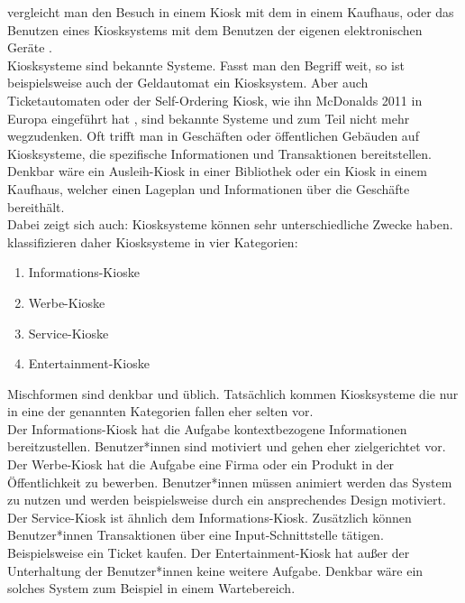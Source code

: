 vergleicht man den Besuch in einem Kiosk mit dem in einem Kaufhaus, oder das Benutzen eines Kiosksystems
mit dem Benutzen der eigenen elektronischen Geräte \cite{multimediale}.\\
Kiosksysteme sind bekannte Systeme. Fasst man den Begriff weit, so ist beispielsweise auch der Geldautomat ein Kiosksystem.
Aber auch Ticketautomaten oder der Self-Ordering Kiosk, wie ihn McDonalds 2011 in Europa 
eingeführt hat \cite{mcdonalds}, sind bekannte Systeme und zum Teil nicht mehr wegzudenken. Oft trifft man in 
Geschäften oder öffentlichen Gebäuden auf Kiosksysteme, die spezifische Informationen und Transaktionen 
bereitstellen. Denkbar wäre ein Ausleih-Kiosk in einer Bibliothek oder ein Kiosk in einem Kaufhaus, welcher einen
Lageplan und Informationen über die Geschäfte bereithält.\\
Dabei zeigt sich auch: Kiosksysteme können sehr unterschiedliche Zwecke haben.  klassifizieren daher
Kiosksysteme in vier Kategorien:

\begin{enumerate}
\item Informations-Kioske
\item Werbe-Kioske
\item Service-Kioske
\item Entertainment-Kioske
\end{enumerate}

Mischformen sind denkbar und üblich. Tatsächlich kommen Kiosksysteme die nur in eine der genannten Kategorien fallen
eher selten vor.\\
Der Informations-Kiosk hat die Aufgabe kontextbezogene Informationen bereitzustellen. Benutzer*innen sind motiviert und
gehen eher zielgerichtet vor. 
Der Werbe-Kiosk hat die Aufgabe eine Firma oder ein Produkt in der Öffentlichkeit zu
bewerben. Benutzer*innen müssen animiert werden das System zu nutzen und werden beispielsweise durch ein ansprechendes
Design motiviert.
Der Service-Kiosk ist ähnlich dem Informations-Kiosk. Zusätzlich können Benutzer*innen Transaktionen über eine 
Input-Schnittstelle tätigen. Beispielsweise ein Ticket kaufen.
Der Entertainment-Kiosk hat außer der Unterhaltung der Benutzer*innen keine weitere Aufgabe. Denkbar wäre ein solches
System zum Beispiel in einem Wartebereich. 